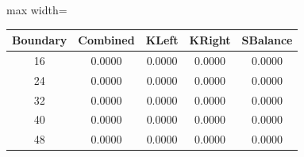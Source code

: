 \begin{table}[h]
\centering
\begin{adjustbox}{max width=\textwidth}
\begin{tabular}{ |c|c|c|c|c| }
\hline
Boundary & Combined & KLeft & KRight & SBalance \\
\hline
16 & 0.0000 & 0.0000 & 0.0000 & 0.0000 \\
\hline
24 & 0.0000 & 0.0000 & 0.0000 & 0.0000 \\
\hline
32 & 0.0000 & 0.0000 & 0.0000 & 0.0000 \\
\hline
40 & 0.0000 & 0.0000 & 0.0000 & 0.0000 \\
\hline
48 & 0.0000 & 0.0000 & 0.0000 & 0.0000 \\
\hline
\end{tabular}
\end{adjustbox}
\end{table}
